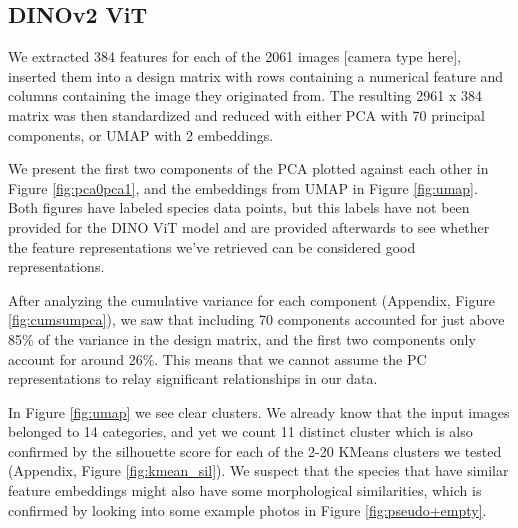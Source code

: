 
%
%
\subsection{DINOv2 ViT}
We extracted 384 features for each of the 2061 images [camera type here], inserted them into a design matrix with rows containing a numerical feature and columns containing the image they originated from. The resulting 2961 x 384 matrix was then standardized and reduced with either PCA with 70 principal components, or UMAP with 2 embeddings. 

We present the first two components of the PCA plotted against each other in Figure \ref{fig:pca0pca1}, and the embeddings from UMAP in Figure \ref{fig:umap}. Both figures have labeled species data points, but this labels have not been provided for the DINO ViT model and are provided afterwards to see whether the feature representations we've retrieved can be considered good representations.

After analyzing the cumulative variance for each component (Appendix, Figure \ref{fig:cumsumpca}), we saw that including 70 components accounted for just above 85\% of the variance in the design matrix, and the first two components only account for around 26\%. This means that we cannot assume the PC representations to relay significant relationships in our data. 

In Figure \ref{fig:umap} we see clear clusters. We already know that the input images belonged to 14 categories, and yet we count 11 distinct cluster which is also confirmed by the silhouette score for each of the 2-20 KMeans clusters we tested (Appendix, Figure \ref{fig:kmean_sil}). We suspect that the species that have similar feature embeddings might also have some morphological similarities, which is confirmed by looking into some example photos in Figure \ref{fig:pseudo+empty}. 

